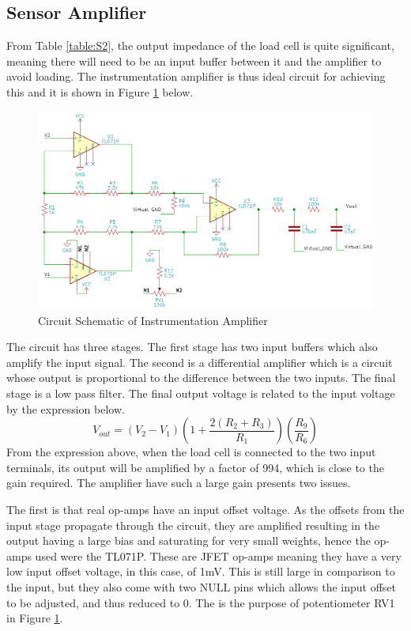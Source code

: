 \documentclass[class=report,11pt,crop=false]{standalone}
\begin{document}
	\subsection{Sensor Amplifier}
	From Table \ref{table:S2}, the output impedance of the load cell is quite significant, meaning there will need to be an input buffer between it and the amplifier to avoid loading. The instrumentation amplifier is thus ideal circuit for achieving this and it is shown in Figure \ref{fig:S1} below.
	
	\begin{figure}[h!]
		\centering
		\includegraphics[width=0.9\linewidth]{Figures/Amplifier.png}
		\caption{Circuit Schematic of Instrumentation Amplifier}
		\label{fig:S1}
	\end{figure}
	
	The circuit has three stages. The first stage has two input buffers which also amplify the input signal. The second is a differential amplifier which is a circuit whose output is proportional to the difference between the two inputs. The final stage is a low pass filter. The final output voltage is related to the input voltage by the expression below.
	\[V_{out} = (V_2 - V_1) \left(1 + \frac{2(R_2+R_3)}{R_1}\right) \left(\frac{R_9}{R_6}\right) \]
	From the expression above, when the load cell is connected to the two input terminals, its output will be amplified by a factor of 994, which is close to the gain required. 
	The amplifier have such a large gain presents two issues.
	
	The first is that real op-amps have an input offset voltage. As the offsets from the input stage propagate through the circuit, they are amplified resulting in the output having a large bias and saturating for very small weights, hence the op-amps used were the TL071P. These are JFET op-amps meaning they have a very low input offset voltage, in this case, of 1mV. This is still large in comparison to the input, but they also come with two NULL pins which allows the input offset to be adjusted, and thus reduced to 0. The is the purpose of potentiometer RV1 in Figure \ref{fig:S1}.
	
\end{document}
